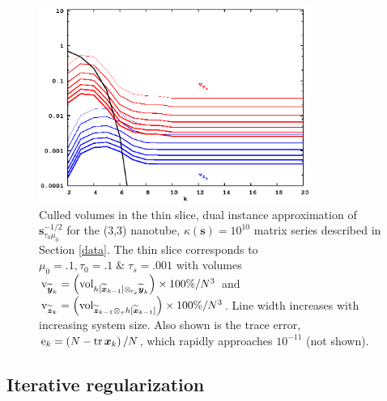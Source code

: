 \documentclass[letterpaper,twocolumn,amsmath,amsfont,amssymb,english,aps,jcp,preprintnumbers,groupaddress,nofootinbib,tightenlines,floatfix]{revtex4}
\newcommand{\mat}[1]{\boldsymbol{#1}}
\newcommand{\ot}{  {\scriptstyle \otimes}_{ \tau } }
\newcommand{\ots}{ {\scriptstyle \otimes}_{ \! \tau_s } }
\theoremstyle{plain}
\theoremstyle{remark}
\theoremstyle{plain}
\begin{document}
\begin{figure}[h]
 \includegraphics[width=3.5in]{fig_33_tube_cond_10_regularized_33_tube_k10_regularized_dual.eps}
\caption{
Culled volumes in the thin slice, dual instance approximation of $\mat{s}^{-1/2}_{\tau_0 \mu_0}$
for the (3,3) nanotube, $\kappa(\mat{s})=10^{10}$ matrix series 
described in Section \ref{data}. The thin slice corresponds to $\mu_0=.1, \tau_0=.1 \;  \&  \; \tau_s=.001$ 
with volumes 
${\rm v}_{\widetilde{\mat{y}}_k}= \left( {\rm vol}_{  h[\widetilde{\mat{x}}_{k-1}] \ots \widetilde{\mat{y}}_k }  \right) \times 100\% /N^3$ and  
${\rm v}_{\widetilde{\mat{z}}_k}= \left( {\rm vol}_{\widetilde{\mat{z}}_{k-1} \ot  h[\widetilde{\mat{x}}_{k-1}]} \right) \times 100\% /N^3$.
Line width increases with increasing system size. 
Also shown is the trace error, ${\rm e}_{k} = \left( N-{\rm tr}\,\mat{x}_k \right)/N$, which rapidly approaches $10^{-11}$ (not shown). 
}\label{regularized_dual}
\end{figure} 


\subsection{Iterative regularization}
\end{document}
